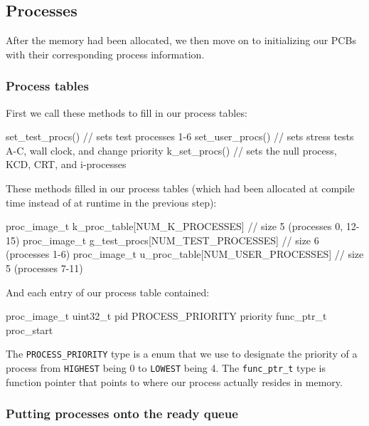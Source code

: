 \documentclass[se]{uw-wkrpt}
\begin{document}
\subsection{Processes}
After the memory had been allocated, we then move on to initializing our PCBs with their corresponding process information.

\subsubsection{Process tables}

First we call these methods to fill in our process tables:
\begin{code}
set_test_procs() // sets test processes 1-6
set_user_procs() // sets stress tests A-C, wall clock, and change priority
k_set_procs() // sets the null process, KCD, CRT, and i-processes
\end{code}

These methods filled in our process tables (which had been allocated at compile time instead of at runtime in the previous step):
\begin{code}
proc_image_t k_proc_table[NUM_K_PROCESSES] // size 5 (processes 0, 12-15)
proc_image_t g_test_procs[NUM_TEST_PROCESSES] // size 6 (processes 1-6)
proc_image_t u_proc_table[NUM_USER_PROCESSES] // size 5 (processes 7-11)
\end{code}

And each entry of our process table contained:
\begin{code}
proc_image_t
    uint32_t pid
    PROCESS_PRIORITY priority
    func_ptr_t proc_start
\end{code}

The \texttt{PROCESS\_PRIORITY} type is a enum that we use to designate the priority of a process from \texttt{HIGHEST} being 0 to \texttt{LOWEST} being 4. The \texttt{func\_ptr\_t} type is function pointer that points to where our process actually resides in memory. 

\subsubsection{Putting processes onto the ready queue}
\end{document}
